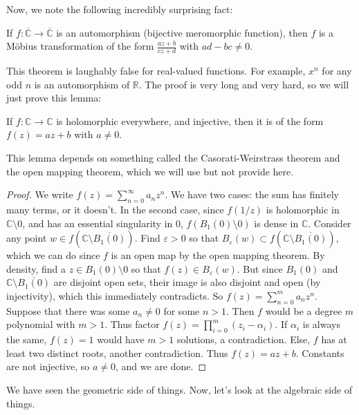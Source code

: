 \documentclass[12pt]{article}
\newenvironment{theorem}{\begin{mytheorem}}{\end{mytheorem}}
\newenvironment{lemma}{\begin{mylemma}}{\end{mylemma}}
\theoremstyle{definitionstyle}
\def\mbb#1{\mathbb{#1}}
\def \C{\mbb{C}}
\def \R{\mbb{R}}
\def \ve{\varepsilon}
\begin{document}
	Now, we note the following incredibly surprising fact:
	\begin{theorem}
		If $f: \overline{\C} \to \overline{\C}$ is an automorphism (bijective meromorphic function), then $f$ is a Möbius transformation of the form $\frac{az+b}{cz+d}$ with $ad-bc \neq 0$.
	\end{theorem}
	This theorem is laughably false for real-valued functions. For example, $x^n$ for any odd $n$ is an automorphism of $\R$. The proof is very long and very hard, so we will just prove this lemma:
	\begin{lemma}
		If $f: \C \to \C$ is holomorphic everywhere, and injective, then it is of the form $f(z) = az + b$ with $a \neq 0$.
	\end{lemma}
	This lemma depends on something  called the Casorati-Weirstrass theorem and the open mapping theorem, which we will use but not provide here. 
	\begin{proof}
		We write $f(z) = \sum_{n=0}^\infty a_nz^n$. We have two cases: the sum has finitely many terms, or it doesn't. In the second case, since $f(1/z)$ is holomorphic in $\C \setminus 0$, and has an essential singularity in 0, $f(B_1(0) \setminus 0)$ is dense in $\C$. Consider any point $w \in f(\C \setminus \overline{B_1(0)})$. Find $\ve > 0$ so that $B_\ve(w) \subset f(\C \setminus \overline{B_1(0)})$, which we can do since $f$ is an open map by the open mapping theorem. By density, find a $z \in B_1(0) \setminus 0$ so that $f(z) \in B_\ve(w)$. But since $B_1(0)$ and $\C \setminus \overline{B_1(0)}$ are disjoint open sets, their image is also disjoint and open (by injectivity), which this immediately contradicts. So $f(z) = \sum_{n=0}^m a_nz^n$. Suppose that there was some $a_n \neq 0$ for some $n > 1$. Then $f$ would be a degree $m$ polynomial with $m > 1$. Thus factor $f(z) = \prod_{i=0}^m (z_i-\alpha_i)$. If $\alpha_i$ is always the same, $f(z) = 1$ would have $m > 1$ solutions, a contradiction. Else, $f$ has at least two distinct roots, another contradiction. Thus $f(z) = az + b$. Constants are not injective, so $a \neq 0$, and we are done.
	\end{proof}
	We have seen the geometric side of things. Now, let's look at the algebraic side of things.
	
\end{document}
